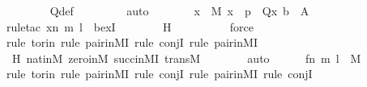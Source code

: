 \begin{isabellebody}
\ \ \ \ \ \ \isamarkupfalse%
\ Q{\isacharunderscore}{\kern0pt}def\ \isanewline
\ \ \ \ \ \ \isamarkupfalse%
\ auto\isanewline
\ \ \ \ \isamarkupfalse%
\ \isamarkupfalse%
\ {\isachardoublequoteopen}{\isasymexists}x\ {\isasymin}\ M{\isachardot}{\kern0pt}\ x\ {\isasymin}\ p\ {\isasymand}\ Q{\isacharparenleft}{\kern0pt}x{\isacharcomma}{\kern0pt}\ b{\isacharparenright}{\kern0pt}{\isachardoublequoteclose}\ {\isacharparenleft}{\kern0pt}\ {\isacharquery}{\kern0pt}A{\isacharparenright}{\kern0pt}\isanewline
\ \ \ \ \ \ \isamarkupfalse%
{\isacharparenleft}{\kern0pt}rule{\isacharunderscore}{\kern0pt}tac\ x{\isacharequal}{\kern0pt}{\isachardoublequoteopen}{\isacharless}{\kern0pt}{\isacharless}{\kern0pt}n{\isacharcomma}{\kern0pt}\ m{\isachargreater}{\kern0pt}{\isacharcomma}{\kern0pt}\ l{\isachargreater}{\kern0pt}{\isachardoublequoteclose}\ \ bexI{\isacharparenright}{\kern0pt}\isanewline
\ \ \ \ \ \ \isamarkupfalse%
\ H\ \isanewline
\ \ \ \ \ \ \ \isamarkupfalse%
\ force\isanewline
\ \ \ \ \ \ \isamarkupfalse%
{\isacharparenleft}{\kern0pt}rule\ to{\isacharunderscore}{\kern0pt}rin{\isacharcomma}{\kern0pt}\ rule\ pair{\isacharunderscore}{\kern0pt}in{\isacharunderscore}{\kern0pt}MI{\isacharcomma}{\kern0pt}\ rule\ conjI{\isacharcomma}{\kern0pt}\ rule\ pair{\isacharunderscore}{\kern0pt}in{\isacharunderscore}{\kern0pt}MI{\isacharparenright}{\kern0pt}\isanewline
\ \ \ \ \ \ \isamarkupfalse%
\ H\ nat{\isacharunderscore}{\kern0pt}in{\isacharunderscore}{\kern0pt}M\ zero{\isacharunderscore}{\kern0pt}in{\isacharunderscore}{\kern0pt}M\ succ{\isacharunderscore}{\kern0pt}in{\isacharunderscore}{\kern0pt}MI\ transM\isanewline
\ \ \ \ \ \ \isamarkupfalse%
\ auto\isanewline
\ \ \ \ \isamarkupfalse%
\ {\isachardoublequoteopen}{\isacharless}{\kern0pt}{\isacharless}{\kern0pt}f{\isacharbackquote}{\kern0pt}n{\isacharcomma}{\kern0pt}\ m{\isachargreater}{\kern0pt}{\isacharcomma}{\kern0pt}\ l{\isachargreater}{\kern0pt}\ {\isasymin}\ M{\isachardoublequoteclose}\ \isanewline
\ \ \ \ \ \ \isamarkupfalse%
{\isacharparenleft}{\kern0pt}rule\ to{\isacharunderscore}{\kern0pt}rin{\isacharcomma}{\kern0pt}\ rule\ pair{\isacharunderscore}{\kern0pt}in{\isacharunderscore}{\kern0pt}MI{\isacharcomma}{\kern0pt}\ rule\ conjI{\isacharcomma}{\kern0pt}\ rule\ pair{\isacharunderscore}{\kern0pt}in{\isacharunderscore}{\kern0pt}MI{\isacharcomma}{\kern0pt}\ rule\ conjI{\isacharparenright}{\kern0pt}\isanewline

\end{isabellebody}
